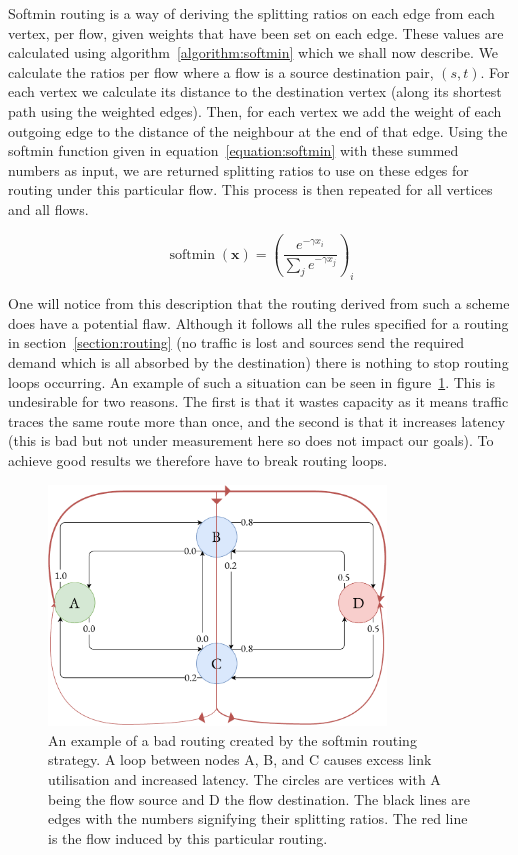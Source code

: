 Softmin routing is a way of deriving the splitting ratios on each edge from each vertex, per flow, given weights that have been set on each edge. These values are calculated using algorithm~\ref{algorithm:softmin} which we shall now describe. We calculate the ratios per flow where a flow is a source destination pair, $(s,t)$. For each vertex we calculate its distance to the destination vertex (along its shortest path using the weighted edges). Then, for each vertex we add the weight of each outgoing edge to the distance of the neighbour at the end of that edge. Using the softmin function given in equation~\ref{equation:softmin} with these summed numbers as input, we are returned splitting ratios to use on these edges for routing under this particular flow. This process is then repeated for all vertices and all flows.

\begin{equation}
  \label{equation:softmin}
  \operatorname{softmin}(\bm{x}) = \left(\frac{e^{-\gamma x_i}}{\sum_{j}{e^{-\gamma x_j}}}\right)_i
\end{equation}

One will notice from this description that the routing derived from such a scheme does have a potential flaw. Although it follows all the rules specified for a routing in section~\ref{section:routing} (no traffic is lost and sources send the required demand which is all absorbed by the destination) there is nothing to stop routing loops occurring. An example of such a situation can be seen in figure~\ref{fig:bad_route}. This is undesirable for two reasons. The first is that it wastes capacity as it means traffic traces the same route more than once, and the second is that it increases latency (this is bad but not under measurement here so does not impact our goals). To achieve good results we therefore have to break routing loops.

\begin{figure}
    \centering
    \includegraphics[width=0.8\textwidth]{figures/bad_route.pdf}
    \caption{An example of a bad routing created by the softmin routing strategy. A loop between nodes A, B, and C causes excess link utilisation and increased latency. The circles are vertices with A being the flow source and D the flow destination. The black lines are edges with the numbers signifying their splitting ratios. The red line is the flow induced by this particular routing.}
    \label{fig:bad_route}
\end{figure}


